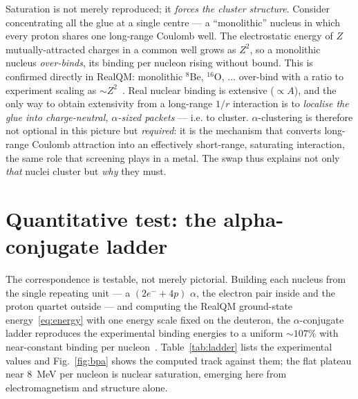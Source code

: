 \documentclass[11pt]{article}
\begin{document}
Saturation is not merely reproduced; it \emph{forces the cluster structure}. Consider concentrating
all the glue at a single centre --- a ``monolithic'' nucleus in which every proton shares one
long-range Coulomb well. The electrostatic energy of $Z$ mutually-attracted charges in a common well
grows as $Z^2$, so a monolithic nucleus \emph{over-binds}, its binding per nucleon rising without
bound. This is confirmed directly in RealQM: monolithic $^8$Be, $^{16}$O, $\dots$ over-bind with a
ratio to experiment scaling as $\sim\!Z^2$~\cite{Johnson-RealNucleus}. Real nuclear binding is
extensive ($\propto A$), and the only way to obtain extensivity from a long-range $1/r$ interaction is
to \emph{localise the glue into charge-neutral, $\alpha$-sized packets} --- i.e. to cluster.
$\alpha$-clustering is therefore not optional in this picture but \emph{required}: it is the mechanism
that converts long-range Coulomb attraction into an effectively short-range, saturating interaction,
the same role that screening plays in a metal. The swap thus explains not only \emph{that} nuclei
cluster but \emph{why} they must.

\section{Quantitative test: the alpha-conjugate ladder}

The correspondence is testable, not merely pictorial. Building each nucleus from the single repeating
unit --- a $(2e^- + 4p)$ $\alpha$, the electron pair inside and the proton quartet outside --- and
computing the RealQM ground-state energy~\eqref{eq:energy} with one energy scale fixed on the
deuteron, the $\alpha$-conjugate ladder reproduces the experimental binding energies to a uniform
$\sim\!107\%$ with near-constant binding per nucleon~\cite{Johnson-RealNucleus}.
Table~\ref{tab:ladder} lists the experimental values and Fig.~\ref{fig:bpa} shows the computed track
against them; the flat plateau near $8$~MeV per nucleon is nuclear saturation, emerging here from
electromagnetism and structure alone.
\end{document}
